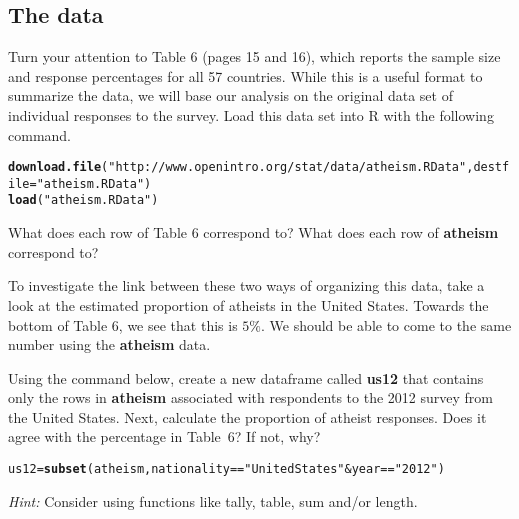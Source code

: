 \documentclass{article}\usepackage[]{graphicx}\usepackage[]{color}
\makeatletter
\newcommand{\hlnum}[1]{\textcolor[rgb]{0.686,0.059,0.569}{#1}}%
\newcommand{\hlstr}[1]{\textcolor[rgb]{0.192,0.494,0.8}{#1}}%
\newcommand{\hlopt}[1]{\textcolor[rgb]{0,0,0}{#1}}%
\newcommand{\hlstd}[1]{\textcolor[rgb]{0.345,0.345,0.345}{#1}}%
\newcommand{\hlkwb}[1]{\textcolor[rgb]{0.69,0.353,0.396}{#1}}%
\newcommand{\hlkwc}[1]{\textcolor[rgb]{0.333,0.667,0.333}{#1}}%
\newcommand{\hlkwd}[1]{\textcolor[rgb]{0.737,0.353,0.396}{\textbf{#1}}}%
\newenvironment{kframe}{%
 \def\at@end@of@kframe{}%
 \ifinner\ifhmode%
  \def\at@end@of@kframe{\end{minipage}}%
  \begin{minipage}{\columnwidth}%
 \fi\fi%
 \def\FrameCommand##1{\hskip\@totalleftmargin \hskip-\fboxsep
 \colorbox{shadecolor}{##1}\hskip-\fboxsep
     \hskip-\linewidth \hskip-\@totalleftmargin \hskip\columnwidth}%
 \MakeFramed {\advance\hsize-\width
   \@totalleftmargin\z@ \linewidth\hsize
   \@setminipage}}%
 {\par\unskip\endMakeFramed%
 \at@end@of@kframe}
\newenvironment{knitrout}{}{} %
\makeatother
\begin{document}
\subsection*{The data}
Turn your attention to Table 6 (pages 15 and 16), which reports the sample size and response percentages for all 57 countries. While this is a useful format to summarize the data, we will base our analysis on the original data set of individual responses to the survey. Load this data set into R with the following command.

\begin{knitrout}
\color{fgcolor}\begin{kframe}
\begin{alltt}
\hlkwd{download.file}\hlstd{(}\hlstr{"http://www.openintro.org/stat/data/atheism.RData"}\hlstd{,} \hlkwc{destfile} \hlstd{=} \hlstr{"atheism.RData"}\hlstd{)}
\hlkwd{load}\hlstd{(}\hlstr{"atheism.RData"}\hlstd{)}
\end{alltt}
\end{kframe}
\end{knitrout}


\begin{exercise}
What does each row of Table 6 correspond to? What does each row of \hlkwd{atheism} correspond to?
\end{exercise}

To investigate the link between these two ways of organizing this data, take a look at the estimated proportion of atheists in the United States. Towards the bottom of Table 6, we see that this is $5\%$. We should be able to come to the same number using the \hlkwd{atheism} data.

\begin{exercise}
Using the command below, create a new dataframe called \hlkwd{us12} that contains only the rows in \hlkwd{atheism} associated with respondents to the 2012 survey from the United States. Next, calculate the proportion of atheist responses. Does it agree with the percentage in Table~6? If not, why?

\begin{knitrout}
\color{fgcolor}\begin{kframe}
\begin{alltt}
\hlstd{us12} \hlkwb{=} \hlkwd{subset}\hlstd{(atheism, nationality} \hlopt{==} \hlstr{"United States"} \hlopt{&} \hlstd{year} \hlopt{==} \hlstr{"2012"}\hlstd{)}
\end{alltt}
\end{kframe}
\end{knitrout}




\emph{Hint:} Consider using functions like \hlnum{tally, table, sum} and/or \hlnum{length}.

\end{exercise}
\end{document}
